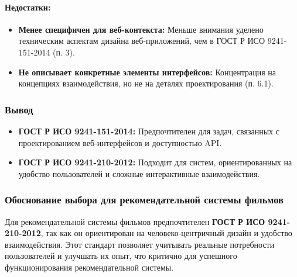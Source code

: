 \paragraph{Недостатки:}
\begin{itemize}
    \item \textbf{Менее специфичен для веб-контекста:} Меньше внимания уделено техническим аспектам дизайна
    веб-приложений, чем в ГОСТ Р ИСО 9241-151-2014 (п. 3).
    \item \textbf{Не описывает конкретные элементы интерфейсов:} Концентрация на концепциях взаимодействия, но не на
    деталях проектирования (п. 6.1).
\end{itemize}

\subsubsection*{Вывод}
\begin{itemize}
    \item \textbf{ГОСТ Р ИСО 9241-151-2014:} Предпочтителен для задач, связанных с проектированием веб-интерфейсов и доступностью API.
    \item \textbf{ГОСТ Р ИСО 9241-210-2012:} Подходит для систем, ориентированных на удобство пользователей и сложные интерактивные взаимодействия.
\end{itemize}

\subsubsection*{Обоснование выбора для рекомендательной системы фильмов}

Для рекомендательной системы фильмов предпочтителен
\textbf{ГОСТ Р ИСО 9241-210-2012}, так как он ориентирован на человеко-центричный дизайн и удобство взаимодействия.
Этот стандарт позволяет учитывать реальные потребности пользователей и улучшать их опыт, что критично для успешного
функционирования рекомендательной системы.
